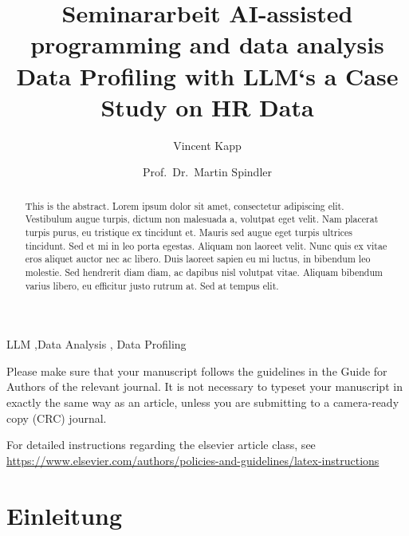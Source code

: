\documentclass[
  11pt,
  authoryear,
  preprint]{elsarticle}
\begin{document}
\begin{frontmatter}
\title{Seminararbeit AI-assisted programming and data
analysis \\\large{Data Profiling with LLM`s a Case Study on HR Data} }
\author[1]{Vincent Kapp%
%
}
\author[2]{Prof.~Dr.~Martin Spindler%
%
}


        
\begin{abstract}
This is the abstract. Lorem ipsum dolor sit amet, consectetur adipiscing
elit. Vestibulum augue turpis, dictum non malesuada a, volutpat eget
velit. Nam placerat turpis purus, eu tristique ex tincidunt et. Mauris
sed augue eget turpis ultrices tincidunt. Sed et mi in leo porta
egestas. Aliquam non laoreet velit. Nunc quis ex vitae eros aliquet
auctor nec ac libero. Duis laoreet sapien eu mi luctus, in bibendum leo
molestie. Sed hendrerit diam diam, ac dapibus nisl volutpat vitae.
Aliquam bibendum varius libero, eu efficitur justo rutrum at. Sed at
tempus elit.
\end{abstract}





\begin{keyword}
    LLM \sep Data Analysis \sep 
    Data Profiling
\end{keyword}
\end{frontmatter}
    
\listoffigures
\listoftables
{}
Please make sure that your manuscript follows the guidelines in the
Guide for Authors of the relevant journal. It is not necessary to
typeset your manuscript in exactly the same way as an article, unless
you are submitting to a camera-ready copy (CRC) journal.

For detailed instructions regarding the elsevier article class, see
\url{https://www.elsevier.com/authors/policies-and-guidelines/latex-instructions}

\section{Einleitung}\label{einleitung}
\end{document}
